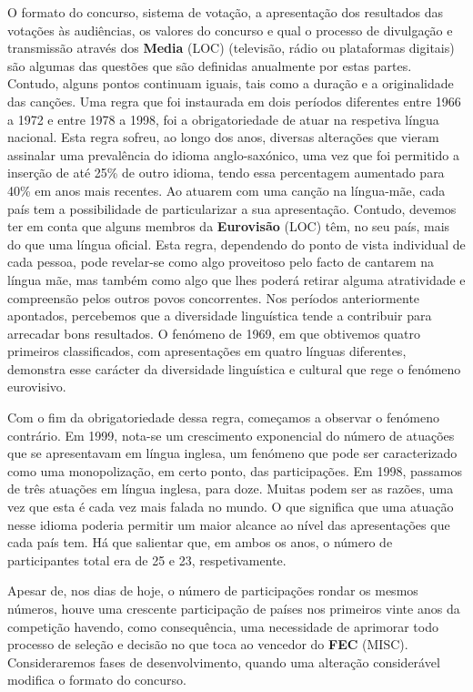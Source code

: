 \documentclass[12pt,a4paper]{article}
\begin{document}
O formato do concurso, sistema de votação, a apresentação dos resultados das votações às  audiências,  os  valores  do  concurso  e  qual  o  processo  de  divulgação  e  transmissão através dos \textbf{Media} (LOC) (televisão, rádio ou plataformas digitais) são algumas das questões que são definidas anualmente por estas partes. Contudo, alguns pontos continuam iguais, tais como  a  duração  e  a  originalidade  das  canções.  Uma  regra  que  foi  instaurada  em  dois períodos diferentes entre 1966 a 1972 e entre 1978 a 1998, foi a obrigatoriedade de atuar na respetiva língua nacional. Esta regra sofreu, ao longo dos anos, diversas alterações que vieram assinalar uma prevalência do idioma anglo-saxónico, uma vez que foi permitido a inserção de até 25\% de outro idioma, tendo essa percentagem aumentado para 40\% em anos  mais  recentes.  Ao  atuarem  com  uma  canção  na  língua-mãe,  cada  país  tem  a possibilidade de particularizar a sua apresentação. Contudo, devemos ter em conta que alguns  membros  da  \textbf{Eurovisão} (LOC)  têm,  no  seu  país,  mais  do  que  uma  língua  oficial.  Esta regra, dependendo do ponto de vista individual de cada pessoa, pode revelar-se como algo proveitoso pelo facto de cantarem na língua mãe, mas também como algo que lhes poderá retirar alguma atratividade e compreensão pelos outros povos concorrentes. Nos períodos anteriormente  apontados,  percebemos  que  a  diversidade  linguística  tende  a  contribuir para arrecadar bons resultados. O fenómeno de 1969, em que obtivemos quatro primeiros classificados, com apresentações em quatro línguas diferentes, demonstra esse carácter da diversidade linguística e cultural que rege o fenómeno eurovisivo.

Com  o  fim  da  obrigatoriedade  dessa  regra,  começamos  a  observar  o  fenómeno contrário. Em 1999, nota-se um crescimento exponencial do número de atuações que se apresentavam  em  língua  inglesa,  um  fenómeno  que  pode  ser  caracterizado  como  uma monopolização, em certo ponto, das participações. Em 1998, passamos de três atuações em língua inglesa, para doze. Muitas podem ser as razões, uma vez que esta é cada vez mais falada no mundo. O que significa que uma atuação nesse idioma poderia permitir um maior alcance ao nível das apresentações que cada país tem. Há que salientar que, em ambos os anos, o número de participantes total era de 25 e 23, respetivamente.

Apesar  de,  nos  dias  de  hoje,  o  número  de  participações  rondar  os  mesmos números,  houve  uma  crescente  participação  de  países  nos  primeiros  vinte  anos  da competição havendo, como consequência, uma necessidade de aprimorar todo processo de  seleção  e  decisão  no  que  toca  ao  vencedor  do  \textbf{FEC} (MISC).  Consideraremos  fases  de desenvolvimento, quando uma alteração  considerável modifica o formato do concurso.
\end{document}

